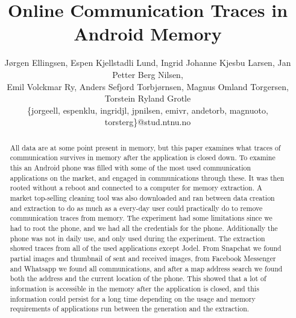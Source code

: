 \documentclass[10pt]{sig-alternate-05-2015}
\begin{document}
\title{Online Communication Traces in Android Memory}

\author{
J{\o}rgen Ellingsen, Espen Kjellstadli Lund, Ingrid Johanne Kjesbu Larsen, Jan Petter Berg Nilsen,\\
Emil Volckmar Ry, Anders Sefjord Torbj{\o}rnsen, Magnus Omland Torgersen, Torstein Ryland Grotle
\\\{jorgeell, espenklu, ingridjl, jpnilsen, emivr, andetorb, magnuoto, torsterg\}@stud.ntnu.no
}

\maketitle
\begin{abstract}
All data are at some point present in memory, but this paper examines what traces of communication survives in memory after the application is closed down. To examine this an Android phone was filled with some of the most used communication applications on the market, and engaged in communications through these. It was then rooted without a reboot and connected to a computer for memory extraction. A market top-selling cleaning tool was also downloaded and ran between data creation and extraction to do as much as a every-day user could practically do to remove communication traces from memory. The experiment had some limitations since we had to root the phone, and we had all the credentials for the phone. Additionally the phone was not in daily use, and only used during the experiment. The extraction showed traces from all of the used applications except Jodel. From Snapchat we found partial images and thumbnail of sent and received images, from Facebook Messenger and Whatsapp we found all communications, and after a map address search we found both the address and the current location of the phone. This showed that a lot of information is accessible in the memory after the application is closed, and this information could persist for a long time depending on the usage and memory requirements of applications run between the generation and the extraction. 
\end{abstract}
















  
\end{document}
